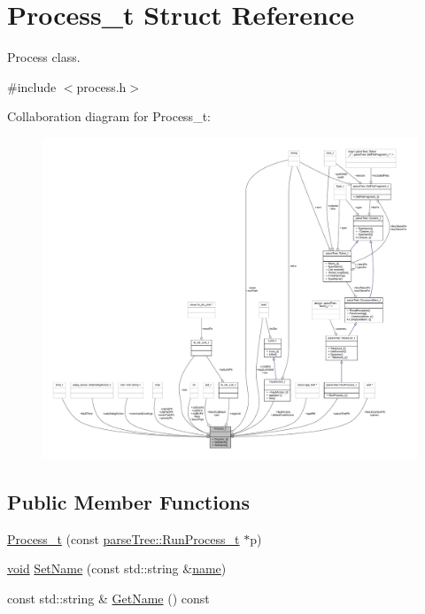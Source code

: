 \hypertarget{struct_process__t}{}\section{Process\+\_\+t Struct Reference}
\label{struct_process__t}


Process class.  




{\ttfamily \#include $<$process.\+h$>$}



Collaboration diagram for Process\+\_\+t\+:
\nopagebreak
\begin{figure}[H]
\begin{center}
\leavevmode
\includegraphics[width=350pt]{struct_process__t__coll__graph}
\end{center}
\end{figure}
\subsection*{Public Member Functions}
\begin{DoxyCompactItemize}
\item 
\hyperlink{struct_process__t_ae432faabfd1f0f891171301f1c9b56ec}{Process\+\_\+t} (const \hyperlink{structparse_tree_1_1_run_process__t}{parse\+Tree\+::\+Run\+Process\+\_\+t} $\ast$p)
\item 
\hyperlink{_t_e_m_p_l_a_t_e__cdef_8h_ac9c84fa68bbad002983e35ce3663c686}{void} \hyperlink{struct_process__t_ac7c3a0271bf16448f8ef2f70d382a392}{Set\+Name} (const std\+::string \&\hyperlink{struct_process__t_aa73c8fe5b5e0a59070882a39e988f2fa}{name})
\item 
const std\+::string \& \hyperlink{struct_process__t_a1f786085bf2615672378d44876215edd}{Get\+Name} () const 
\end{DoxyCompactItemize}
